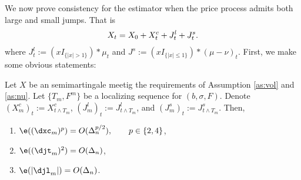 \begin{comment} \subsection{Infinite activity \levy jumps}
We now turn to the case of a price process specified in full generality by \eqref{eq:generalsemimartingale}, that is the price process is a sum of a continuous and a discontinuous process with possibly  infinite activity. The infinite activity assumption is equivalent to  the statement that $\nu$ assigns  infinite measure to the complement of the singleton containing zero.    The following is the consistency Proposition in this more general framework:
\end{comment}
We now prove consistency for the estimator when the price process admits both large and small jumps. That is 
\begin{align}
  X_t = X_0 + X^c_t + J^l_t + J^s_t. \notag
  \label{}
\end{align}
where $J^l_t := (xI_{\{\vert x \vert > 1\}}) \ast \mu_t$ and  $J^s := (xI_{\{\vert x \vert \le 1\}}) \ast (\mu - \nu)_t$.
First, we make some obvious statements:
\begin{lem}\label{lem:est}
  Let $X$ be an \ito semimartingale meetig the requirements of Assumption \ref{as:vol} and \ref{as:nu}. Let $\{T_m, F^m\}$ be a localizing sequence for $(b, \sigma, F)$. Denote $(X^c_m)_t := X^c_{t \wedge T_m}$,  $(J^l_m)_t := J^l_{t \wedge T_m}$, and $(J^s_m)_t := J^s_{t \wedge T_m}$. Then,
  \begin{enumerate}
    \item $\e((\dxc_m)^p) = O(\Delta_n^{p/2}), \qquad p \in \{2, 4\}$,
    \item $\e((\djt_m)^2) = O(\Delta_n)$,
    \item $\e(\vert \djl_m \vert ) = O(\Delta_n)$.
  \end{enumerate}
\end{lem}
